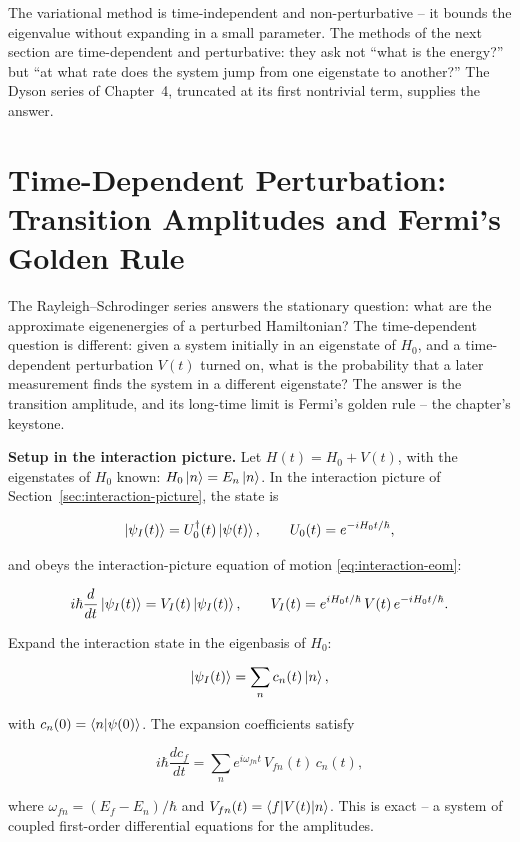The variational method is time-independent and non-perturbative -- it bounds the eigenvalue without expanding in a small parameter. The methods of the next section are time-dependent and perturbative: they ask not ``what is the energy?'' but ``at what rate does the system jump from one eigenstate to another?'' The Dyson series of Chapter~4, truncated at its first nontrivial term, supplies the answer.

\section{Time-Dependent Perturbation: Transition Amplitudes and Fermi's Golden Rule}
\label{sec:tdpt}

The Rayleigh--Schrodinger series answers the stationary question: what are the approximate eigenenergies of a perturbed Hamiltonian? The time-dependent question is different: given a system initially in an eigenstate of $H_{0}$, and a time-dependent perturbation $V(t)$ turned on, what is the probability that a later measurement finds the system in a different eigenstate? The answer is the transition amplitude, and its long-time limit is Fermi's golden rule -- the chapter's keystone.

\medskip\noindent\textbf{Setup in the interaction picture.}
Let $H(t) = H_{0} + V(t)$, with the eigenstates of $H_{0}$ known: $H_{0}\ket{n} = E_{n}\ket{n}$. In the interaction picture of Section~\ref{sec:interaction-picture}, the state is
\begin{linenomath}
\begin{equation*}
\ket{\psi_{I}(t)} = U_{0}^{\dagger}(t)\ket{\psi(t)},
\qquad U_{0}(t) = e^{-iH_{0}t/\hbar},
\end{equation*}
\end{linenomath}
and obeys the interaction-picture equation of motion \eqref{eq:interaction-eom}:
\begin{linenomath}
\begin{equation*}
i\hbar\frac{d}{dt}\ket{\psi_{I}(t)} = V_{I}(t)\ket{\psi_{I}(t)},
\qquad V_{I}(t) = e^{iH_{0}t/\hbar}\,V(t)\,e^{-iH_{0}t/\hbar}.
\end{equation*}
\end{linenomath}
Expand the interaction state in the eigenbasis of $H_{0}$:
\begin{linenomath}
\begin{equation*}
\ket{\psi_{I}(t)} = \sum_{n} c_{n}(t)\ket{n},
\end{equation*}
\end{linenomath}
with $c_{n}(0) = \braket{n|\psi(0)}$. The expansion coefficients satisfy
\begin{linenomath}
\begin{equation*}
i\hbar\frac{d c_{f}}{dt} = \sum_{n} e^{i\omega_{fn}t}\,V_{fn}(t)\,c_{n}(t),
\end{equation*}
\end{linenomath}
where $\omega_{fn} = (E_{f}-E_{n})/\hbar$ and $V_{fn}(t) = \braket{f|V(t)|n}$. This is exact -- a system of coupled first-order differential equations for the amplitudes.

